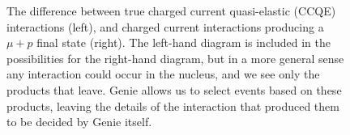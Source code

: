 \begin{figure}
\centering
{}
\caption[Charged current neutrino interactions producing a $\mu + p$ final state]{\label{fig:feynman-cc}The difference between true charged current quasi-elastic (CCQE) interactions (left), and charged current interactions producing a $\mu + p$ final state (right). The left-hand diagram is included in the possibilities for the right-hand diagram, but in a more general sense any interaction could occur in the nucleus, and we see only the products that leave. Genie allows us to select events based on these products, leaving the details of the interaction that produced them to be decided by Genie itself.}
\end{figure}
